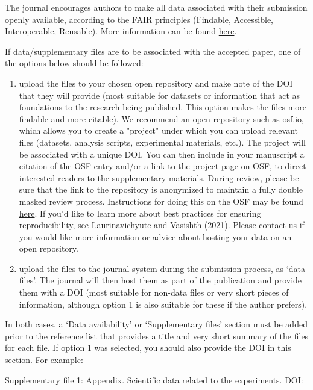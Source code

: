 \documentclass[charis,linguex]{glossa}
\begin{document}
The journal encourages authors to make all data associated with their submission openly available, according to the FAIR principles (Findable, Accessible, Interoperable, Reusable). More information can be found \href{https://www.glossa-journal.org/site/editorial-policies/#data-policy}{here}.

If data/supplementary files are to be associated with the accepted paper, one of the options below should be followed:
\begin{enumerate}
\item upload the files to your chosen open repository and make note of the DOI that they will provide (most suitable for datasets or information that act as foundations to the research being published. This option makes the files more findable and more citable). We recommend an open repository such as osf.io, which allows you to create a "project" under which you can upload relevant files (datasets, analysis scripts, experimental materials, etc.). The project will be associated with a unique DOI. You can then include in your manuscript a citation of the OSF entry and/or a link to the project page on OSF, to direct interested readers to the supplementary materials. During review, please be sure that the link to the repository is anonymized to maintain a fully double masked review process. Instructions for doing this on the OSF may be found \href{https://help.osf.io/hc/en-us/articles/360019930333-Create-a-View-only-Link-for-a-Project}{here}. If you'd like to learn more about best practices for ensuring reproducibility, see \href{https://psyarxiv.com/hf297/}{Laurinavichyute and Vasishth (2021)}. Please contact us if you would like more information or advice about hosting your data on an open repository.
\item upload the files to the journal system during the submission process, as `data files'. The journal will then host them as part of the publication and provide them with a DOI (most suitable for non-data files or very short pieces of information, although option 1 is also suitable for these if the author prefers).
\end{enumerate}

\noindent In both cases, a `Data availability' or `Supplementary files' section must be added prior to the reference list that provides a title and very short summary of the files for each file. If option 1 was selected, you should also provide the DOI in this section. For example:

\noindent Supplementary file 1: Appendix. Scientific data related to the experiments. DOI: 
\end{document}
